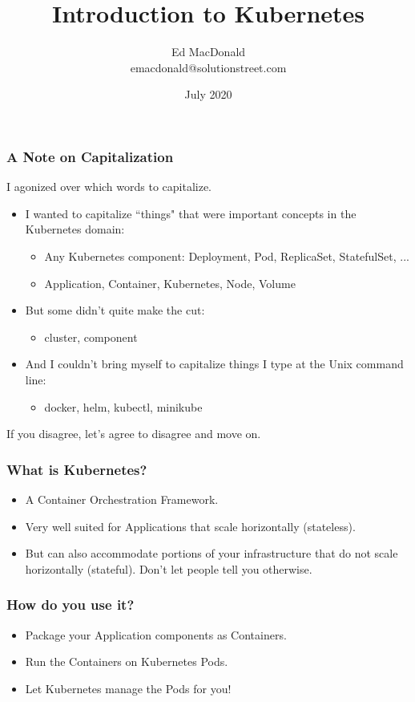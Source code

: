 \documentclass{beamer}
\title[Kubernetes]{Introduction to Kubernetes}
\author[Ed MacDonald]{Ed MacDonald\\emacdonald@solutionstreet.com}
\institute[\href{https://solutionstreet.com}{SolutionStreet}]{SolutionStreet\\\href{https://solutionstreet.com}{(solutionstreet.com)}}
\date{July 2020}
\begin{document}
\frame{\titlepage}

\begin{frame}
\frametitle{A Note on Capitalization}

I agonized over which words to capitalize.

\begin{itemize}
   \item{I wanted to capitalize ``things" that were important concepts in the Kubernetes domain:}
   \begin{itemize}
      \item{Any Kubernetes component: Deployment, Pod, ReplicaSet, StatefulSet, ...}
      \item{Application, Container, Kubernetes, Node, Volume}
   \end{itemize}

   \item{But some didn't quite make the cut:}
   \begin{itemize}
      \item{cluster, component}
   \end{itemize}

   \item{And I couldn't bring myself to capitalize things I type at the Unix command line:}
   \begin{itemize}
      \item{docker, helm, kubectl, minikube}
   \end{itemize}
\end{itemize}

If you disagree, let's agree to disagree and move on.

\end{frame}

\begin{frame}
\frametitle{What is Kubernetes?}
\begin{itemize}
    \item{A Container Orchestration Framework.}
    \item{Very well suited for Applications that scale horizontally (stateless).}
    \item{But can also accommodate portions of your infrastructure that do not scale horizontally (stateful). Don't let people tell you otherwise.}
\end{itemize}
\end{frame}

\begin{frame}
    \frametitle{How do you use it?}
    \begin{itemize}
        \item{Package your Application components as Containers.}
        \item{Run the Containers on Kubernetes Pods.}
        \item{Let Kubernetes manage the Pods for you!}
    \end{itemize}
\end{frame}
\end{document}
